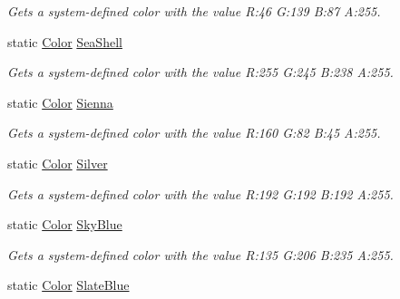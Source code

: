 \begin{DoxyCompactItemize}
\begin{DoxyCompactList}\small\item\em Gets a system-\/defined color with the value R\+:46 G\+:139 B\+:87 A\+:255.\end{DoxyCompactList}\item 
static \hyperlink{structMicrosoft_1_1Xna_1_1Framework_1_1Color}{Color} \hyperlink{structMicrosoft_1_1Xna_1_1Framework_1_1Color_af4680dab307b3f90e2547e23f5ad1fa3}{Sea\+Shell}
\begin{DoxyCompactList}\small\item\em Gets a system-\/defined color with the value R\+:255 G\+:245 B\+:238 A\+:255.\end{DoxyCompactList}\item 
static \hyperlink{structMicrosoft_1_1Xna_1_1Framework_1_1Color}{Color} \hyperlink{structMicrosoft_1_1Xna_1_1Framework_1_1Color_a37a261d1a024bbc8fd49fdbe36ddd384}{Sienna}
\begin{DoxyCompactList}\small\item\em Gets a system-\/defined color with the value R\+:160 G\+:82 B\+:45 A\+:255.\end{DoxyCompactList}\item 
static \hyperlink{structMicrosoft_1_1Xna_1_1Framework_1_1Color}{Color} \hyperlink{structMicrosoft_1_1Xna_1_1Framework_1_1Color_a14d21c030d1e5a6cab3b87b34e035f73}{Silver}
\begin{DoxyCompactList}\small\item\em Gets a system-\/defined color with the value R\+:192 G\+:192 B\+:192 A\+:255.\end{DoxyCompactList}\item 
static \hyperlink{structMicrosoft_1_1Xna_1_1Framework_1_1Color}{Color} \hyperlink{structMicrosoft_1_1Xna_1_1Framework_1_1Color_ac3790779955b5c2931d801e40544c3c5}{Sky\+Blue}
\begin{DoxyCompactList}\small\item\em Gets a system-\/defined color with the value R\+:135 G\+:206 B\+:235 A\+:255.\end{DoxyCompactList}\item 
static \hyperlink{structMicrosoft_1_1Xna_1_1Framework_1_1Color}{Color} \hyperlink{structMicrosoft_1_1Xna_1_1Framework_1_1Color_a5c0c65acec90aac1948898b030dc211e}{Slate\+Blue}

\end{DoxyCompactItemize}
